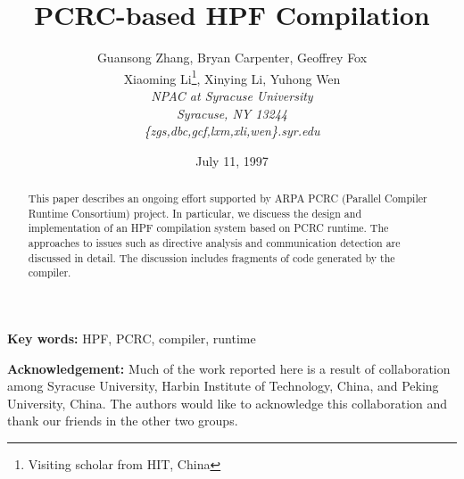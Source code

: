 


%





\title{\vspace{2in}PCRC-based HPF Compilation}

\author{Guansong Zhang, Bryan Carpenter, Geoffrey Fox \\
        Xiaoming Li\thanks{Visiting scholar from HIT, China},
        Xinying Li, Yuhong Wen \vspace{5mm} \\
        \em NPAC at Syracuse University \\
        \em Syracuse, NY 13244 \\
        \em \{zgs,dbc,gcf,lxm,xli,wen\}\@npac.syr.edu}

%

\date{July 11, 1997}

\maketitle

\begin{abstract}

This paper describes an ongoing effort supported by ARPA
PCRC (Parallel Compiler Runtime Consortium) project. In particular,
we discuess the design and implementation of an HPF compilation
system based on PCRC runtime. The approaches to issues such as 
directive analysis and communication detection are discussed in detail.
The discussion includes fragments of code generated by the compiler.
\end{abstract}

{\bf Key words:} HPF, PCRC, compiler, runtime

{\bf Acknowledgement:} Much of the work reported here is
             a result of collaboration among Syracuse University,
             Harbin Institute of Technology, China, and
             Peking University, China. The authors would like to
               acknowledge this collaboration and thank our
             friends in the other two groups.

